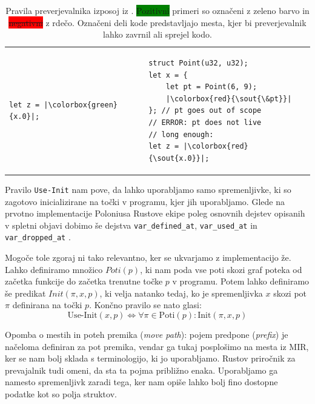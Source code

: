 \documentclass[a4paper,12pt,openright]{book}
\newcommand{\goodexample}[1]{\colorbox{green}{#1}}
\newcommand{\badexample}[1]{\colorbox{red}{\sout{#1}}}
\begin{document}
{\begin{table}[!htbp]
\begin{tabular}{p{} p{} p{}}
\begin{minipage}[t]{0.41\textwidth}
\begin{verbatim}
let z = |\goodexample{x.0}|;
\end{verbatim}
		\end{minipage}           &                                                  %
		\begin{minipage}[t]{0.41\textwidth}
			\begin{verbatim}
struct Point(u32, u32);
let x = {
    let pt = Point(6, 9);
    |\badexample{\&pt}|
}; // pt goes out of scope
// ERROR: pt does not live
// long enough:
let z = |\badexample{x.0}|;
\end{verbatim}
		\end{minipage}
	\end{tabular}
	\caption[The Rules of the Borrow Check]{
		Pravila preverjevalnika izposoj iz \cite{stjernaModellingRustsReference}. \goodexample{Pozitivni}
		primeri so označeni z zeleno barvo in \badexample{negativni} z rdečo. Označeni deli kode predstavljajo mesta,
		kjer bi preverjevalnik lahko zavrnil ali sprejel kodo.
	}\label{tab:borrow-check}
\end{table}%
}

Pravilo \verb|Use-Init| nam pove, da lahko uporabljamo samo spremenljivke, ki so zagotovo inicializirane
na točki v programu, kjer jih uporabljamo. Glede na prvotno implementacije Poloniusa Rustove ekipe poleg
osnovnih dejstev opisanih v spletni objavi dobimo še dejstva \verb|var_defined_at|, \verb|var_used_at| in
\verb|var_dropped_at| \cite{RustlangPoloniusDefines}.

Mogoče tole zgoraj ni tako relevantno, ker se ukvarjamo z implementacijo že. Lahko definiramo množico
$Poti(p)$, ki nam poda vse poti skozi graf poteka od začetka funkcije do začetka trenutne točke $p$
v programu. Potem lahko definiramo še predikat $Init(\pi, x, p)$, ki velja natanko tedaj, ko je spremenljivka
$x$ skozi pot $\pi$ definirana na točki $p$. Končno pravilo se nato glasi:
\begin{equation}
	\text{Use-Init}(x, p) \iff \forall \pi \in \text{Poti}(p): \text{Init}(\pi, x, p)
\end{equation}

Opomba o mestih in poteh premika (\textit{move path}): pojem predpone (\textit{prefix}) je načeloma definiran za pot
premika, vendar ga tukaj posplošimo na mesta iz MIR, ker se nam bolj sklada s terminologijo, ki jo uporabljamo.
Rustov priročnik za prevajalnik tudi omeni, da sta ta pojma približno enaka. Uporabljamo ga namesto spremenljivk
zaradi tega, ker nam opiše lahko bolj fino dostopne podatke kot so polja struktov.
\end{document}
